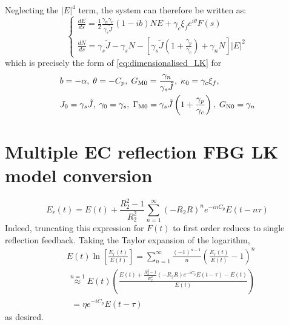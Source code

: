 %
Neglecting the $|E|^{4}$ term, the system can therefore be written as:
%
\begin{equation*}
\left\{\begin{array}{l}
\displaystyle \frac{d E}{d s}=\frac{1}{2} \frac{\gamma_{n}\gamma_c}{\gamma_{s} \tilde{J}}(1-ib) N E+\gamma_c\xi_{f} e^{i\theta} F(s) \\ 
\displaystyle \frac{d N}{d s}=\gamma_{s} \tilde{J}-\gamma_{s} N-\left[\gamma_{s} \tilde{J}\left(1+\frac{\gamma_{p}}{\gamma_{c}}\right)+\gamma_{n} N\right]|E|^{2}\end{array}\right.
\end{equation*}
%
which is precisely the form of \eqref{eq:dimensionalised_LK} for
%
$$
\begin{aligned}
& b = -\alpha, \; \theta=-C_{p}, \; G_\text{M0}=\frac{\gamma_{n}}{\gamma_{s} \tilde{J}}, \; \kappa_{0}=\gamma_{c} \xi_{f}, \\
& J_{0}=\gamma_{s} \tilde{J}, \; \gamma_{0}=\gamma_{s}, \; \Gamma_\text{M0}=\gamma_{s} \tilde{J}\left(1+\frac{\gamma_{p}}{\gamma_{c}}\right), \; G_\text{N0}=\gamma_{n}
\end{aligned}
$$
%
%
\section{Multiple EC reflection FBG LK model conversion}
\label{app:EC_multiple}
%
\begin{equation*}
    E_r(t) = E(t) + \frac{R_2^2 - 1}{R_2^2} \sum_{n=1}^\infty (-R_2 R)^n e^{-i n C_p} E(t-n \tau)
\end{equation*}
%
Indeed, truncating this expression for $F(t)$ to first order reduces to single reflection feedback. Taking the Taylor expansion of the logarithm,
%
\begin{equation*}
    \begin{aligned}
        &E(t) \ln{\left[ \frac{E_r(t)}{E(t)} \right]} = \sum_{n=1}^\infty \frac{(-1)^{n-1}}{n}\left( \frac{E_r(t)}{E(t)} - 1\right)^n \\
        &\,\overset{n=1}{\approx} E(t)\left( \frac{E(t) + \frac{R_2^2 - 1}{R_2^2}(-R_2 R)e^{-i C_p} E(t - \tau) - E(t)}{E(t)} \right)\\
        &\;\;= \eta e^{-i C_p} E(t - \tau)
    \end{aligned}   
\end{equation*}
%
as desired.

